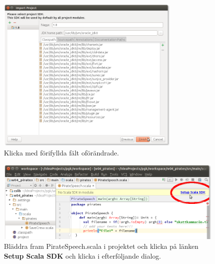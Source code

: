 \begin{figure}
\centering
\includegraphics[width=0.8\textwidth]{../img/intellij/idea-import6-select-SDK.png} 
\caption{Klicka  med förifyllda fält oförändrade.}
\label{fig:idea:import6-select-SDK}
\end{figure}

\begin{figure}
\centering
\includegraphics[width=1.0\textwidth]{../img/intellij/idea-import7-setup-scala-sdk.png} 

\caption{Bläddra fram PirateSpeech.scala i projektet  och klicka på länken \textbf{Setup Scala SDK} och klicka  i efterföljande dialog.}
\label{fig:idea:import78-setup-scala-sdk}
\end{figure}

